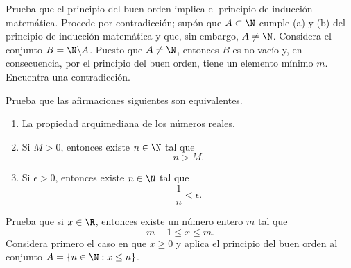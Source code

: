 \documentclass[12pt,a4paper]{book}
\begin{document}
    \begin{ejercicio}\label{ej:69}
        Prueba que el principio del buen orden implica el principio de
        inducción matemática. \sugerencia Procede por contradicción; supón que
        $A\subset\N$ cumple (a) y (b) del principio de inducción matemática y que, sin
        embargo, $A\neq\N$. Considera el conjunto $B=\N\backslash A$. Puesto que $A\neq\N$,
        entonces $B$ es no vacío y, en consecuencia, por el principio del buen orden,
        tiene un elemento mínimo $m$. Encuentra una contradicción.
    \end{ejercicio}

    \begin{ejercicio}\label{ej:70}
        Prueba
        que las afirmaciones siguientes son equivalentes.
        \begin{enumerate}
            \item La propiedad arquimediana de los números reales.
            \item Si $M>0$, entonces existe $n\in\N$ tal que
            \begin{equation*}
                n>M.
            \end{equation*}
            \item Si $\epsilon>0$, entonces existe $n\in\N$ tal que
            \begin{equation*}
                \frac{1}{n}<\epsilon.
            \end{equation*}
        \end{enumerate}
    \end{ejercicio}

    \begin{ejercicio}\label{ej:71}
        Prueba que si $x\in\R$, entonces existe un número entero $m$ tal
        que
        \begin{equation*}
            m-1\leq x\leq m.
        \end{equation*}
        \sugerencia Considera primero el caso en que $x\geq 0$ y aplica el principio del
        buen orden al conjunto $A=\{n\in\N:x\leq n\}$.
    \end{ejercicio}
\end{document}
